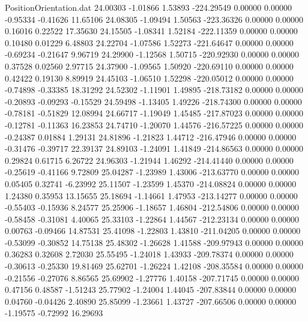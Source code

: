 \begin{filecontents}{PositionOrientation.dat}
  24.00303   -1.01866    1.53893  -224.29549    0.00000    0.00000   -0.95334   -0.41626   11.65106
  24.08305   -1.09494    1.50563  -223.36326    0.00000    0.00000    0.16016    0.22522   17.35630
  24.15505   -1.08341    1.52184  -222.11359    0.00000    0.00000    0.10480    0.01229    6.48803
  24.22704   -1.07586    1.52273  -221.64647    0.00000    0.00000   -0.69234   -0.21647    9.96719
  24.29900   -1.12568    1.50715  -220.92930    0.00000    0.00000    0.37528    0.02560    2.97715
  24.37900   -1.09565    1.50920  -220.69110    0.00000    0.00000    0.42422    0.19130    8.89919
  24.45103   -1.06510    1.52298  -220.05012    0.00000    0.00000   -0.74898   -0.33385   18.31292
  24.52302   -1.11901    1.49895  -218.73182    0.00000    0.00000   -0.20893   -0.09293   -0.15529
  24.59498   -1.13405    1.49226  -218.74300    0.00000    0.00000   -0.78181   -0.51829   12.08994
  24.66717   -1.19049    1.45485  -217.87023    0.00000    0.00000   -0.12781   -0.11363   16.23853
  24.74710   -1.20070    1.44576  -216.57225    0.00000    0.00000   -0.24387    0.01884    1.29131
  24.81896   -1.21823    1.44712  -216.47946    0.00000    0.00000   -0.31476   -0.39717   22.39137
  24.89103   -1.24091    1.41849  -214.86563    0.00000    0.00000    0.29824    0.61715    6.26722
  24.96303   -1.21944    1.46292  -214.41440    0.00000    0.00000   -0.25619   -0.41166    9.72809
  25.04287   -1.23989    1.43006  -213.63770    0.00000    0.00000    0.05405    0.32741   -6.23992
  25.11507   -1.23599    1.45370  -214.08824    0.00000    0.00000    1.24380    0.35953   13.15655
  25.18694   -1.14661    1.47953  -213.14277    0.00000    0.00000   -0.55403   -0.15936    8.24577
  25.25906   -1.18657    1.46804  -212.54806    0.00000    0.00000   -0.58458   -0.31081    4.40065
  25.33103   -1.22864    1.44567  -212.23134    0.00000    0.00000    0.00763   -0.09466   14.87531
  25.41098   -1.22803    1.43810  -211.04205    0.00000    0.00000   -0.53099   -0.30852   14.75138
  25.48302   -1.26628    1.41588  -209.97943    0.00000    0.00000    0.36283    0.32608    2.72030
  25.55495   -1.24018    1.43933  -209.78374    0.00000    0.00000   -0.30613   -0.25330   19.81469
  25.62701   -1.26224    1.42108  -208.35584    0.00000    0.00000   -0.21556   -0.27076    8.86565
  25.69902   -1.27776    1.40158  -207.71745    0.00000    0.00000    0.47156    0.48587   -1.51243
  25.77902   -1.24004    1.44045  -207.83844    0.00000    0.00000    0.04760   -0.04426    2.40890
  25.85099   -1.23661    1.43727  -207.66506    0.00000    0.00000   -1.19575   -0.72992   16.29693

\end{filecontents}
